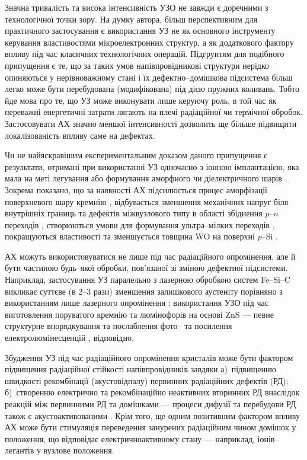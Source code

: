 Значна тривалість та висока інтенсивність УЗО не завжди є доречними з технологічної точки зору.
На думку автора, більш перспективним для практичного застосування є використання УЗ не як основного інструменту керування властивостями мікроелектронних структур, а як додаткового фактору впливу під час класичних технологічних операцій.
Підгрунтям для подібного припущення є те, що за таких умов напівпровідникові структури нерідко опиняються у нерівноважному стані і їх дефектно--домішкова підсистема більш легко може бути перебудована (модифікована) під дією пружних коливань.
Тобто йде мова про те, що УЗ може виконувати лише керуючу роль, в той час як переважні енергетичні затрати
лягають на плечі радіаційної чи термічної обробок.
Застосовувати АХ значно меншої інтенсивності дозволить ще більше підвищити локалізованість впливу саме на дефектах.

Чи не найяскравішим експериментальним доказом даного припущення є результати, отримані при
використанні УЗ одночасно з іонною імплантацією, яка мала на меті легування або формування аморфного чи діелектричного шарів \cite{US:ImplantUFJ2015,US:ImplantUFJ2001,US:ImplantUFJ2008,ROMANYUK2005,Roman2006,RomanyukSST,
YOlikh2005,ROMANJUK2005MatSci,USImplant:JVacSci}.
Зокрема показано, що за наявності АХ
підсилюється процес аморфізації поверхневого шару кремнію \cite{RomanyukSST,US:ImplantUFJ2001},
відбувається зменшення механічних напруг біля внутрішніх границь \cite{US:ImplantUFJ2008,ROMANJUK2005MatSci}
та дефектів міжвузлового типу в області збіднення $p$--$n$ переходів \cite{YOlikh2005},
створюються умови для формування ультра--мілких переходів \cite{USImplant:JVacSci},
покращуються властивості та зменшується товщина WO на поверхні $p$--Si \cite{ROMANYUK2005,Roman2006}.

АХ можуть використовуватися не лише під час радіаційного опромінення, але й бути частиною будь--якої обробки, пов'язаної зі зміною дефектної підсистеми.
Наприклад, застосування УЗ паралельно з лазерною обробкою систем Fe--Si--C викликає суттєве (в 2--3 рази) зменшення залишкового аустеніту порівняно з використанням лише лазерного опромінення \cite{US:FeSiC};
використання УЗО під час виготовлення поруватого кремнію та люмінофорів на основі ZnS --- певне структурне впорядкування \cite{Kalem2000} та послаблення фото-- та посилення електролюмінесценцій \cite{Wang:JLum}, відповідно.


Збудження УЗ під час радіаційного опромінення кристалів може бути фактором підвищення радіаційної стійкості напівпровідників завдяки 
а)~підвищенню швидкості рекомбінації (акустовідпалу) первинних радіаційних дефектів (РД);
б)~створенню електрично та рекомбінаційно неактивних вторинних РД внаслідок реакцій між первинними РД та домішками --- процеси дифузії та перебудови РД також є акустоактивованими \cite{YOlikh2006TPLr,Parchinskii2000r}.
Крім того, ще одним позитивним фактором впливу АХ може бути стимуляція переведення занурених радіаційним чином домішок у положення, що відповідає електричноактивному стану --- наприклад, іонів--легантів у вузлове положення.


